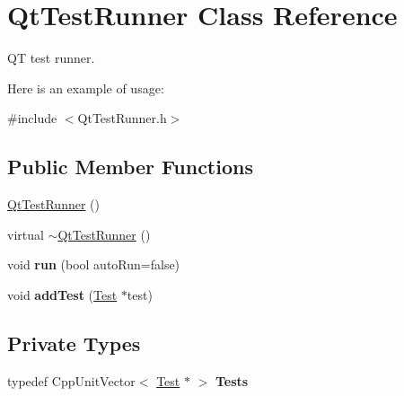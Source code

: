 \hypertarget{class_qt_test_runner}{}\section{Qt\+Test\+Runner Class Reference}
\label{class_qt_test_runner}


QT test runner.

Here is an example of usage\+:  




{\ttfamily \#include $<$Qt\+Test\+Runner.\+h$>$}

\subsection*{Public Member Functions}
\begin{DoxyCompactItemize}
\item 
\hyperlink{class_qt_test_runner_a6343dbe4e69b8bdd238a4f080619f929}{Qt\+Test\+Runner} ()
\item 
virtual \hyperlink{class_qt_test_runner_a71264fc7621f31989fc510f35b0fd668}{$\sim$\+Qt\+Test\+Runner} ()
\item 
void {\bfseries run} (bool auto\+Run=false)\hypertarget{class_qt_test_runner_ac3b0f28df1611fd01f83a7b0bcae72e3}{}\label{class_qt_test_runner_ac3b0f28df1611fd01f83a7b0bcae72e3}

\item 
void {\bfseries add\+Test} (\hyperlink{class_test}{Test} $\ast$test)\hypertarget{class_qt_test_runner_a31e4c6548007d2c94e277341e7168802}{}\label{class_qt_test_runner_a31e4c6548007d2c94e277341e7168802}

\end{DoxyCompactItemize}
\subsection*{Private Types}
\begin{DoxyCompactItemize}
\item 
typedef Cpp\+Unit\+Vector$<$ \hyperlink{class_test}{Test} $\ast$ $>$ {\bfseries Tests}\hypertarget{class_qt_test_runner_a77ee24f0d508bd2246e2e674cef6ba17}{}\label{class_qt_test_runner_a77ee24f0d508bd2246e2e674cef6ba17}

\end{DoxyCompactItemize}
